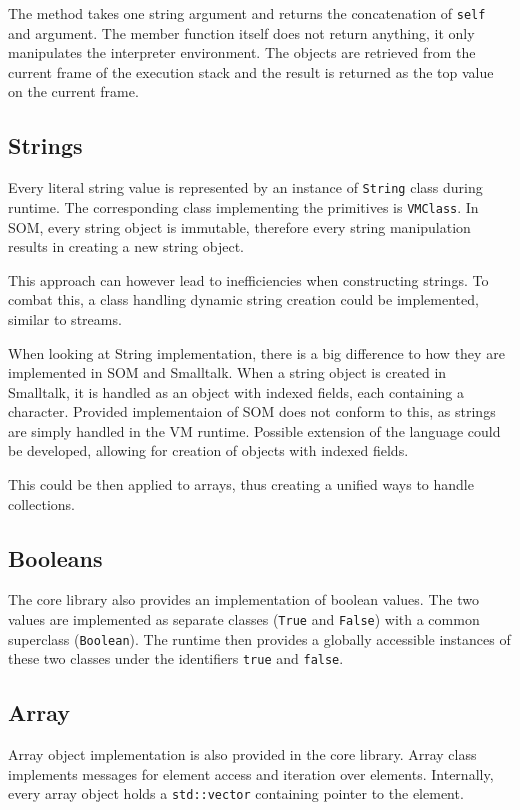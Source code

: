 \documentclass[thesis=M,english]{FITthesis}[2019/12/23]
\begin{document}
The method takes one string argument and returns the concatenation of \texttt{self} and argument. The member function itself does not return anything,
it only manipulates the interpreter environment. The objects are retrieved from the current frame of the execution stack and the result is returned
as the top value on the current frame.

\subsection{Strings}
Every literal string value is represented by an instance of \texttt{String} class during runtime. The corresponding class implementing the primitives is
\texttt{VMClass}. In SOM, every string object is immutable, therefore every string manipulation results in creating a new string object.

This approach can however lead to inefficiencies when constructing strings. To combat this, a class handling dynamic string creation could
be implemented, similar to streams.

When looking at String implementation, there is a big difference to how they are implemented in SOM and Smalltalk. When a string object
is created in Smalltalk, it is handled as an object with indexed fields, each containing a character. Provided implementaion of SOM does not
conform to this, as strings are simply handled in the VM runtime. Possible extension of the language could be developed, allowing for
creation of objects with indexed fields.

This could be then applied to arrays, thus creating a unified ways to handle collections.

\subsection{Booleans}
The core library also provides an implementation of boolean values. The two values are implemented as separate classes (\texttt{True} and \texttt{False})
with a common superclass (\texttt{Boolean}). The runtime then provides a globally accessible instances of these two classes under the identifiers
\texttt{true} and \texttt{false}.

\subsection{Array}
Array object implementation is also provided in the core library. Array class implements messages for element access and iteration over
elements. Internally, every array object holds a \texttt{std::vector} containing pointer to the element.
\end{document}

